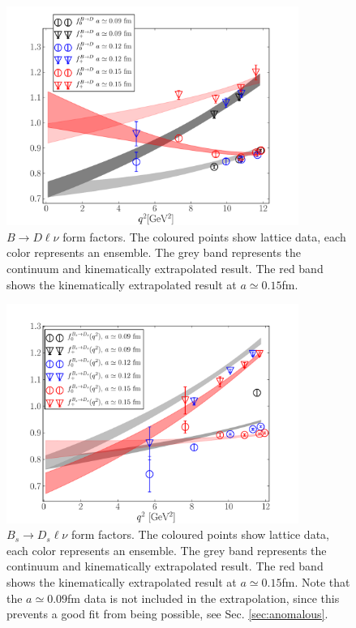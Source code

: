 \begin{figure}[htb!]
  \begin{center}
    \includegraphics[width=0.85\textwidth]{images/nrqcd/BD_formfactors.pdf}
  \end{center}
  \caption{$B\to D\ell\nu$ form factors. The coloured points show lattice data, each color represents an ensemble. The grey band represents the continuum and kinematically extrapolated result. The red band shows the kinematically extrapolated result at $a\simeq 0.15$fm. \label{fig:BD_formfactors}}
\end{figure}

\begin{figure}[htb!]
  \begin{center}
        \includegraphics[width=0.85\textwidth]{images/nrqcd/BsDs_formfactors.pdf}
  \end{center}
  \caption{$B_s\to D_s\ell\nu$ form factors. The coloured points show lattice data, each color represents an ensemble. The grey band represents the continuum and kinematically extrapolated result. The red band shows the kinematically extrapolated result at $a\simeq 0.15$fm. Note that the $a\simeq 0.09$fm data is not included in the extrapolation, since this prevents a good fit from being possible, see Sec. \ref{sec:anomalous}. \label{fig:BsDs_formfactors}}
\end{figure}

